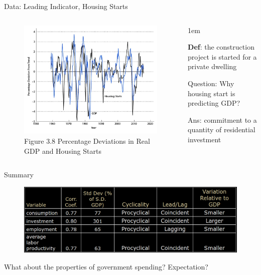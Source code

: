 \documentclass[11pt,aspectratio=43]{beamer}
\let\olditemize=\itemize
\let\endolditemize=\enditemize
\renewenvironment{itemize}{\olditemize \itemsep1em}{\endolditemize}
\theoremstyle{definition}
\begin{document}
\begin{frame}{Data: Leading Indicator, Housing Starts}
\label{slide:Data__Leading_Indicator}
    \begin{columns}
        \begin{column}{0.5\textwidth}
            \begin{figure}
                \caption{Figure 3.8  Percentage Deviations in Real GDP and Housing Starts}
                \includegraphics[width=\textwidth]{./figures/Figure3_8.jpg}
            \end{figure}
        \end{column}
        \begin{column}{0.5\textwidth}
            \begin{itemize}
                \item \textbf{Def}: the construction project is started for a private dwelling
                \item \alert{Question}: Why housing start is predicting GDP?
                \item Ans: \alert{commitment} to a quantity of residential \alert{investment}
            \end{itemize}
        \end{column}
    \end{columns}
\end{frame}

\begin{frame}{Summary}
\label{slide:Summary}
    \begin{figure}
        \includegraphics[width=\textwidth]{./figures/BCSummary.png}
    \end{figure}

    What about the properties of government spending? Expectation?
\end{frame}
\end{document}
